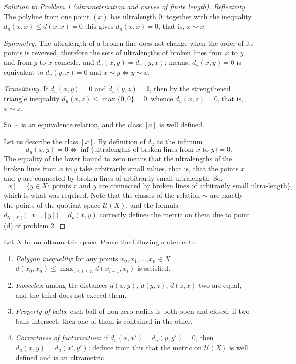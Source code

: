 \documentclass[a4paper,12pt]{report}
\begin{document}
\begin{proof}[Solution to Problem \textup{1} \textup{(}ultrametrization and curves of finite length\textup{)}]
\textit{Reflexivity.} The polyline from one point $(x)$ has ultralength $0$\textup{;} together with the inequality $d_u(x,x)\le d(x,x)=0$ this gives $d_u(x,x)=0$, that is, $x\sim x$.

\textit{Symmetry.} The ultralength of a broken line does not change when the order of its points is reversed, therefore the sets of ultralengths of broken lines from $x$ to $y$ and from $y$ to $x$ coincide, and $d_u(x,y)=d_u(y,x)$\textup{;} means, $d_u(x,y)=0$ is equivalent to $d_u(y,x)=0$ and $x\sim y\iff y\sim x$.

\textit{Transitivity.} If $d_u(x,y)=0$ and $d_u(y,z)=0$, then by the strengthened triangle inequality $d_u(x,z)\le\max\{0,0\}=0$, whence $d_u(x,z)=0$, that is, $x\sim z$.

So $\sim$ is an equivalence relation, and the class $[x]$ is well defined.

Let us describe the class $[x]$. By definition of $d_u$ as the infimum
\[
d_u(x,y)=0\iff\inf\bigl\{\text{ultralengths of broken lines from }x\text{ to }y\bigr\}=0 .
\]
The equality of the lower bound to zero means that the ultralengths of the broken lines from $x$ to $y$ take arbitrarily small values, that is, that the points $x$ and $y$ are connected by broken lines of arbitrarily small ultralength. So,
\[
[x]=\{y\in X:\ \text{points } x \text{ and } y \text{ are connected by broken lines of arbitrarily small ultra-length}\},
\]
which is what was required. Note that the classes of the relation $\sim$ are exactly the points of the quotient space $\mathcal U(X)$, and the formula $d_{\mathcal U(X)}\bigl([x],[y]\bigr)=d_u(x,y)$ correctly defines the metric on them due to point \textup{(d)} of problem \textup{2}.

\end{proof}
\begin{task}
Let $X$ be an ultrametric space. Prove the following statements.
\begin{enumerate}[label=\textup{(\alph*)}]
\item \emph{Polygon inequality}\textup{:} for any points $x_0,x_1,\dots,x_n\in X$ $d(x_0,x_n)\le\max_{1\le i\le n}d(x_{i-1},x_i)$ is satisfied.
\item \emph{Isosceles}\textup{:} among the distances $d(x,y)$, $d(y,z)$, $d(z,x)$ two are equal, and the third does not exceed them.
\item \emph{Property of balls}\textup{:} each ball of non-zero radius is both open and closed\textup{;} if two balls intersect, then one of them is contained in the other.
\item \emph{Correctness of factorization}\textup{:} if $d_u(x,x')=d_u(y,y')=0$, then $d_u(x,y)=d_u(x',y')$\textup{;} deduce from this that the metric on $\mathcal U(X)$ is well defined and is an ultrametric.
\end{enumerate}
\end{task}
\end{document}
